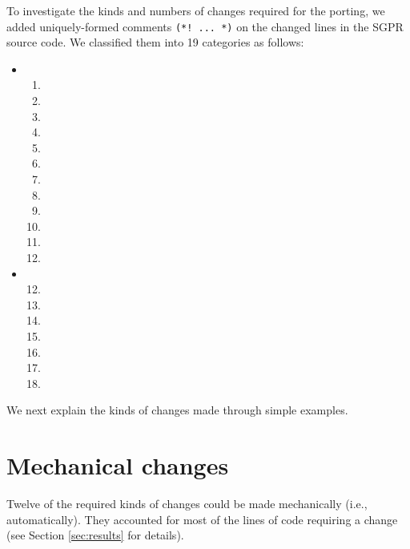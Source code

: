 \documentclass[10pt,a4paper]{article}
\begin{document}
To investigate the kinds and numbers of changes required for the porting,
we added uniquely-formed comments \lstinline|(*! ... *)| on the changed lines in the SGPR
source code.
We classified them into 19 categories as follows:
\begin{itemize}
\item {}
  \begin{enumerate}
  \item {}
  \item {}
  \item {}
  \item {}
  \item {}
  \item {}
  \item {}
  \item {}
  \item {}
  \item {}
  \item {}
  \item {}
  \end{enumerate}
\item {}
  \begin{enumerate}
    \setcounter{enumi}{11}
  \item {}
  \item {}
  \item {}
  \item {}
  \item {}
  \item {}
  \item {}
  \end{enumerate}
\end{itemize}
We next explain the kinds of changes made through simple examples.

\section{Mechanical changes}
\label{sec:mechanical-changes}

Twelve of the required kinds of changes could be made mechanically
(i.e., automatically).
They accounted for most of the lines of code requiring a change
(see Section \ref{sec:results} for details).
\end{document}

